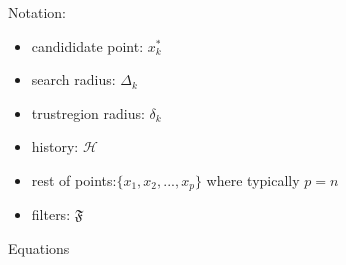 Notation:
\begin{itemize}
    \item candididate point: $x^*_k$
    \item search radius: $\Delta_k$
    \item trustregion radius: $\delta_k$
    \item history: $\mathcal{H}$
    \item rest of points:$\{x_1, x_2,...,x_p\}$ where typically $p=n$
    \item filters: $\mathfrak{F}$
\end{itemize}

Equations
